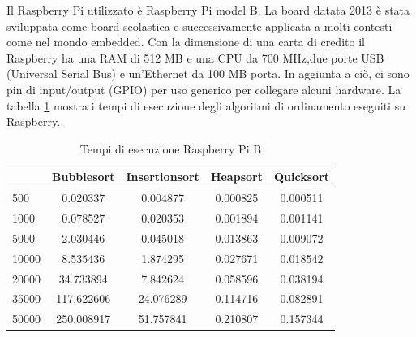 \documentclass[12pt,a4paper]{report}
\begin{document}
Il Raspberry Pi utilizzato è Raspberry Pi model B. La board datata 2013 è stata sviluppata come board scolastica e successivamente applicata a molti contesti come nel mondo embedded.
Con la dimensione di una carta di credito il Raspberry ha una RAM di 512 MB e una CPU da 700 MHz,due porte USB (Universal Serial Bus) e un'Ethernet da 100 MB porta. In aggiunta a ciò, ci sono pin di input/output (GPIO) per uso generico per collegare alcuni hardware.  La tabella \ref{Tab:RaspSorting} mostra i tempi di esecuzione degli algoritmi di ordinamento eseguiti su Raspberry.

\begin{table}[h]
		\centering
		\begin{tabular}		{| l | c | c | c | c |}
		\hline
		      & Bubblesort & Insertionsort & Heapsort & Quicksort \\ \hline
500   & 0.020337      & 0.004877      & 0.000825 & 0.000511     \\ \hline
1000  & 0.078527	    & 0.020353      & 0.001894 & 0.001141     \\ \hline
5000  & 2.030446      & 0.045018     & 0.013863  & 0.009072   \\ \hline
10000 & 8.535436      & 1.874295     & 0.027671 & 0.018542     \\ \hline
20000 & 34.733894   & 7.842624      & 0.058596  & 0.038194   \\ \hline
35000 & 117.622606     & 24.076289     & 0.114716  & 0.082891   \\ \hline
50000 & 250.008917     & 51.757841   & 0.210807  & 0.157344  \\ \hline

		\end{tabular}
		\caption{Tempi di esecuzione Raspberry Pi B}
		\label{Tab:RaspSorting}
			\end{table}
\end{document}
